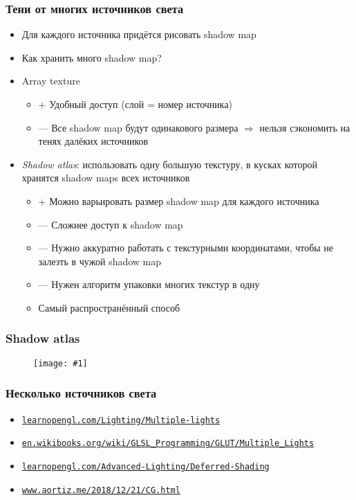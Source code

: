 \documentclass[10pt]{beamer}
\newcommand{\slideimage}[1]{
  \begin{figure}
    \begin{adjustbox}{width=\textwidth, totalheight=\textheight-2\baselineskip-2\baselineskip,keepaspectratio}
      \texttt{[image: \#1]}
    \end{adjustbox}
  \end{figure}
}
\begin{document}
\begin{frame}[fragile]
\frametitle{Тени от многих источников света}
\begin{itemize}
\item Для каждого источника придётся рисовать shadow map
\pause
\item Как хранить много shadow map?
\pause
\item Array texture
\begin{itemize}
\item {\color{green}+} Удобный доступ (слой = номер источника)
\item {\color{red}—} Все shadow map будут одинакового размера \begin{math}\Rightarrow\end{math} нельзя сэкономить на тенях далёких источников
\end{itemize}
\pause
\item \textit{Shadow atlas}: использовать одну большую текстуру, в кусках которой хранятся shadow maps всех источников
\begin{itemize}
\item {\color{green}+} Можно варьировать размер shadow map для каждого источника
\item {\color{red}—} Сложнее доступ к shadow map
\item {\color{red}—} Нужно аккуратно работать с текстурными координатами, чтобы не залезть в чужой shadow map
\item {\color{red}—} Нужен алгоритм упаковки многих текстур в одну
\item Самый распространённый способ
\end{itemize}
\end{itemize}
\end{frame}

\begin{frame}[fragile]
\frametitle{Shadow atlas}
\slideimage{shadow_atlas.png}
\end{frame}

\begin{frame}[fragile]
\frametitle{Несколько источников света}
\begin{itemize}
\item \href{https://learnopengl.com/Lighting/Multiple-lights}{\texttt{learnopengl.com/Lighting/Multiple-lights}}
\item \href{https://en.wikibooks.org/wiki/GLSL_Programming/GLUT/Multiple_Lights}{\texttt{en.wikibooks.org/wiki/GLSL\_Programming/GLUT/Multiple\_Lights}}
\item \href{https://learnopengl.com/Advanced-Lighting/Deferred-Shading}{\texttt{learnopengl.com/Advanced-Lighting/Deferred-Shading}}
\item \href{http://www.aortiz.me/2018/12/21/CG.html}{\texttt{www.aortiz.me/2018/12/21/CG.html}}
\end{itemize}
\end{frame}
\end{document}

